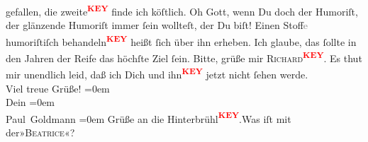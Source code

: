 \begin{ledgroupsized}[t]{13cm}
                    gefallen, die zweite\textcolor{red}{\textsuperscript{\textbf{KEY}}} finde ich {\pb} köſtlich. Oh Gott, wenn Du doch der Humoriſt,
                    der glänzende Humoriſt  immer ſein wollteſt,  der Du biſt! Einen Stoff\textcolor{gray}{e} humoriſtiſch behandeln\textcolor{red}{\textsuperscript{\textbf{KEY}}} heißt ſich über ihn erheben. Ich glaube, das ſollte in
                    den Jahren der Reife das höchſte Ziel ſein. \pend
           \pstart
           Bitte, grüße mir \textsc{Richard\textcolor{red}{\textsuperscript{\textbf{KEY}}}}. Es thut mir unendlich leid, daß ich {\pb}
                    Dich und ihn\textcolor{red}{\textsuperscript{\textbf{KEY}}} jetzt nicht ſehen werde. {\\[\baselineskip]}Viel
                    treue Grüße!\pend
           \leftskip=0em{}\pstart
           {\\[\baselineskip]}Dein\pend
           \leftskip=0em{}\pstart
           {\\[\baselineskip]}\spacefill\mbox{Paul Goldmann}\pend
           \leftskip=0em{}\pstart
           Grüße an die Hinterbrühl\textcolor{red}{\textsuperscript{\textbf{KEY}}}.Was iſt mit der»\textsc{Beatrice}«? \pend
           
         
         \endnumbering{}\end{ledgroupsized}\begin{anhang}\end{anhang}\newcommand{\dateiname}{L03215}\newcommand{\titel}{Paul Goldmann an Arthur Schnitzler, 30. 7. [1902]}\newcommand{\editorInnen}{Martin Anton Müller und Laura Untner}
      
